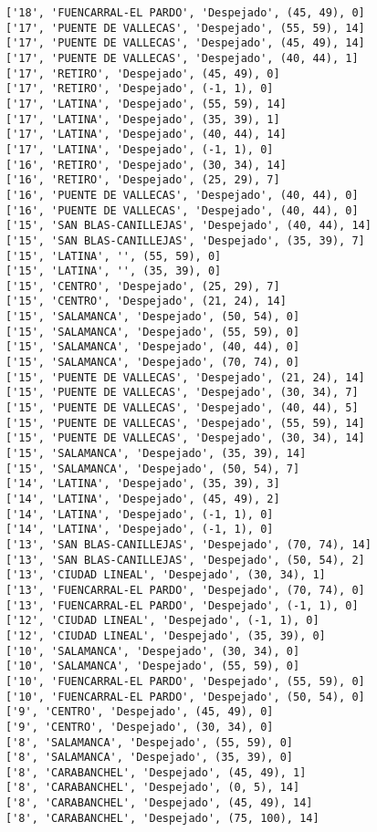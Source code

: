 \documentclass[11pt]{article}
\begin{document}
\begin{Verbatim}[commandchars=\\\{\}]
['18', 'FUENCARRAL-EL PARDO', 'Despejado', (45, 49), 0]
['17', 'PUENTE DE VALLECAS', 'Despejado', (55, 59), 14]
['17', 'PUENTE DE VALLECAS', 'Despejado', (45, 49), 14]
['17', 'PUENTE DE VALLECAS', 'Despejado', (40, 44), 1]
['17', 'RETIRO', 'Despejado', (45, 49), 0]
['17', 'RETIRO', 'Despejado', (-1, 1), 0]
['17', 'LATINA', 'Despejado', (55, 59), 14]
['17', 'LATINA', 'Despejado', (35, 39), 1]
['17', 'LATINA', 'Despejado', (40, 44), 14]
['17', 'LATINA', 'Despejado', (-1, 1), 0]
['16', 'RETIRO', 'Despejado', (30, 34), 14]
['16', 'RETIRO', 'Despejado', (25, 29), 7]
['16', 'PUENTE DE VALLECAS', 'Despejado', (40, 44), 0]
['16', 'PUENTE DE VALLECAS', 'Despejado', (40, 44), 0]
['15', 'SAN BLAS-CANILLEJAS', 'Despejado', (40, 44), 14]
['15', 'SAN BLAS-CANILLEJAS', 'Despejado', (35, 39), 7]
['15', 'LATINA', '', (55, 59), 0]
['15', 'LATINA', '', (35, 39), 0]
['15', 'CENTRO', 'Despejado', (25, 29), 7]
['15', 'CENTRO', 'Despejado', (21, 24), 14]
['15', 'SALAMANCA', 'Despejado', (50, 54), 0]
['15', 'SALAMANCA', 'Despejado', (55, 59), 0]
['15', 'SALAMANCA', 'Despejado', (40, 44), 0]
['15', 'SALAMANCA', 'Despejado', (70, 74), 0]
['15', 'PUENTE DE VALLECAS', 'Despejado', (21, 24), 14]
['15', 'PUENTE DE VALLECAS', 'Despejado', (30, 34), 7]
['15', 'PUENTE DE VALLECAS', 'Despejado', (40, 44), 5]
['15', 'PUENTE DE VALLECAS', 'Despejado', (55, 59), 14]
['15', 'PUENTE DE VALLECAS', 'Despejado', (30, 34), 14]
['15', 'SALAMANCA', 'Despejado', (35, 39), 14]
['15', 'SALAMANCA', 'Despejado', (50, 54), 7]
['14', 'LATINA', 'Despejado', (35, 39), 3]
['14', 'LATINA', 'Despejado', (45, 49), 2]
['14', 'LATINA', 'Despejado', (-1, 1), 0]
['14', 'LATINA', 'Despejado', (-1, 1), 0]
['13', 'SAN BLAS-CANILLEJAS', 'Despejado', (70, 74), 14]
['13', 'SAN BLAS-CANILLEJAS', 'Despejado', (50, 54), 2]
['13', 'CIUDAD LINEAL', 'Despejado', (30, 34), 1]
['13', 'FUENCARRAL-EL PARDO', 'Despejado', (70, 74), 0]
['13', 'FUENCARRAL-EL PARDO', 'Despejado', (-1, 1), 0]
['12', 'CIUDAD LINEAL', 'Despejado', (-1, 1), 0]
['12', 'CIUDAD LINEAL', 'Despejado', (35, 39), 0]
['10', 'SALAMANCA', 'Despejado', (30, 34), 0]
['10', 'SALAMANCA', 'Despejado', (55, 59), 0]
['10', 'FUENCARRAL-EL PARDO', 'Despejado', (55, 59), 0]
['10', 'FUENCARRAL-EL PARDO', 'Despejado', (50, 54), 0]
['9', 'CENTRO', 'Despejado', (45, 49), 0]
['9', 'CENTRO', 'Despejado', (30, 34), 0]
['8', 'SALAMANCA', 'Despejado', (55, 59), 0]
['8', 'SALAMANCA', 'Despejado', (35, 39), 0]
['8', 'CARABANCHEL', 'Despejado', (45, 49), 1]
['8', 'CARABANCHEL', 'Despejado', (0, 5), 14]
['8', 'CARABANCHEL', 'Despejado', (45, 49), 14]
['8', 'CARABANCHEL', 'Despejado', (75, 100), 14]

\end{Verbatim}
\end{document}
